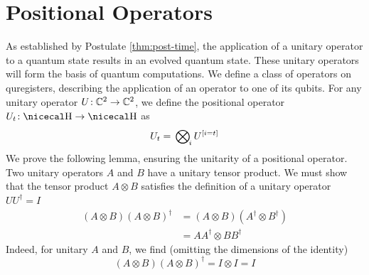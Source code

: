 \documentclass[a4paper,11pt, oneside]{report}
\begin{document}
\section{Positional Operators}
As established by Postulate \ref{thm:post-time}, the application of a unitary operator to a quantum state results in an evolved quantum state. These unitary operators will form the basis of quantum computations. We define a class of operators on quregisters, describing the application of an operator to one of its qubits.
 \label{thm:def-qop} For any unitary operator $U\!:\mathbb{C}^2 \to\mathbb{C}^2$, we define the positional operator~$U_t\!:\hilbert\to\hilbert$ as
\begin{equation} \label{eq:qop}
U_t = \sideset{}{_{\negthinspace i}}\bigotimes U^{[i=t]}
\end{equation}
We prove the following lemma, ensuring the unitarity of a positional operator.
\lemma Two unitary operators $A$ and $B$  have a unitary tensor product.
\proof We must show that the tensor product $A \otimes B$ satisfies the definition of a unitary operator $UU^\dagger = I$
\begin{equation*}
\begin{split}
(A \otimes B)(A \otimes B)^\dagger
     &= (A \otimes B)(A^\dagger \otimes B^\dagger) \\
     &= AA^\dagger  \otimes BB^\dagger
     \end{split}
\end{equation*}
Indeed, for unitary $A$ and $B$, we find (omitting the dimensions of the identity)
$$(A \otimes B)(A \otimes B)^\dagger  = I \otimes I = I$$
\end{document}

